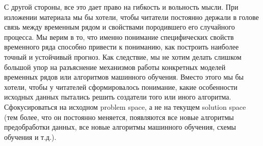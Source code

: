 С другой стороны, все это дает право на гибкость и вольность мысли.
При изложении материала мы бы хотели, чтобы читатели постоянно
держали в голове связь между временным рядом и свойствами
породившего его случайного процесса.
Мы верим в то, что именно понимание специфических
свойств временного ряда способно привести к пониманию, как
построить наиболее точный и устойчивый прогноз. Как следствие, мы
не хотим делать слишком большой упор на разъяснение механизмов
работы конкретных моделей временных рядов или алгоритмов машинного
обучения. Вместо этого мы бы хотели, чтобы у читателей
сформировалось понимание, какие особенности исходных данных
пытались решить создатели того или иного алгоритма. Сфокусироваться
на исходном problem space, а не на текущем solution space
(тем более, что он постоянно меняется, появляются все новые алгоритмы
  предобработки данных, все новые алгоритмы машинного обучения, схемы
обучения и т.д.).